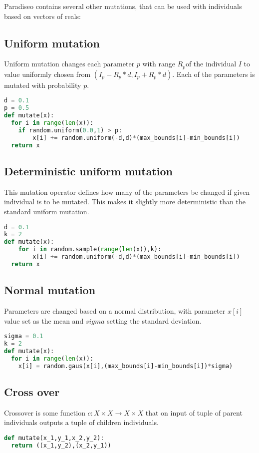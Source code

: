 \documentclass[12pt,oneside]{fithesis2}
\begin{document}
Paradiseo contains several other mutations, that can be used with individuals based on vectors of reals:

\subsection{Uniform mutation} 
Uniform mutation changes each parameter $p$ with range $R_p$of the individual $I$ to value uniformly chosen from $(I_p - R_p*d,I_p + R_p*d)$. Each of the parameters is mutated with probability $p$.
\begin{lstlisting}[language=Python,label=mutate_example,caption=Uniform mutation example]
d = 0.1
p = 0.5
def mutate(x):
  for i in range(len(x)):
    if random.uniform(0.0,1) > p:
        x[i] += random.uniform(-d,d)*(max_bounds[i]-min_bounds[i])
  return x
\end{lstlisting}

\subsection{Deterministic uniform mutation}
This mutation operator defines how many of the parameters be changed if given individual is to be mutated. This makes it  slightly more deterministic than the standard uniform mutation.
\begin{lstlisting}[language=Python,label=mutate_example,caption=Deterministic uniform mutation example]
d = 0.1
k = 2
def mutate(x):
    for i in random.sample(range(len(x)),k):
        x[i] += random.uniform(-d,d)*(max_bounds[i]-min_bounds[i])
  return x
\end{lstlisting}

\subsection{Normal mutation}
Parameters are changed based on a normal distribution, with parameter $x[i]$ value set as the mean and $sigma$ setting the standard deviation.
\begin{lstlisting}[language=Python,label=mutate_example,caption=Normal mutation example]
sigma = 0.1
k = 2
def mutate(x):
  for i in range(len(x)):
    x[i] = random.gaus(x[i],(max_bounds[i]-min_bounds[i])*sigma)
\end{lstlisting}

\subsection{Cross over}
Crossover is some function $c:X \times X \to X \times X$ that on input of tuple of parent individuals outputs a tuple of children individuals. 
\begin{lstlisting}[language=Python,label=cross_example,caption=Crossover example]
def mutate(x_1,y_1,x_2,y_2):
  return ((x_1,y_2),(x_2,y_1))
\end{lstlisting}
\end{document}
